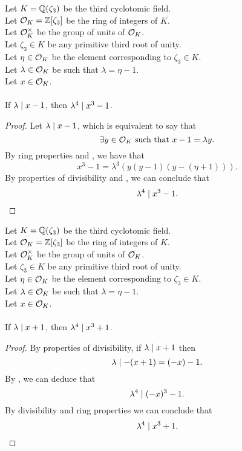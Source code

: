 \begin{lemma}
    \label{lmm:lambda_pow_four_dvd_cube_sub_one_of_dvd_sub_one}
    \leanok
    Let $K = \mathbb{Q}(\zeta_3)$ be the third cyclotomic field. \\
    Let $\mathcal{O}_K = \mathbb{Z}[\zeta_3]$ be the ring of integers of $K$. \\
    Let $\mathcal{O}^\times_K$ be the group of units of $\mathcal{O}_K$. \\
    Let $\zeta_3 \in K$ be any primitive third root of unity. \\
    Let $\eta \in \mathcal{O}_K$ be the element corresponding to $\zeta_3 \in K$. \\
    Let $\lambda \in \mathcal{O}_K$ be such that $\lambda = \eta -1$. \\
    Let $x \in \mathcal{O}_K$. \\\\
    If $\lambda\mid x - 1$, then $\lambda^ 4 \mid x^3 - 1$.
\end{lemma}
\begin{proof}
    \leanok
    Let $\lambda \mid x - 1$, which is equivalent to say that
    $$\exists y\in \mathcal{O}_K \text{ such that } x - 1 = \lambda y.$$
    By ring properties and , we have that
    $$x^3 - 1 = \lambda^3 (y (y - 1) (y - (\eta + 1))).$$
    By properties of divisibility and ,
    we can conclude that $$\lambda^ 4 \mid x^3 - 1.$$
\end{proof}

\begin{lemma}
    \label{lmm:lambda_pow_four_dvd_cube_add_one_of_dvd_add_one}
    \leanok
    Let $K = \mathbb{Q}(\zeta_3)$ be the third cyclotomic field. \\
    Let $\mathcal{O}_K = \mathbb{Z}[\zeta_3]$ be the ring of integers of $K$. \\
    Let $\mathcal{O}^\times_K$ be the group of units of $\mathcal{O}_K$. \\
    Let $\zeta_3 \in K$ be any primitive third root of unity. \\
    Let $\eta \in \mathcal{O}_K$ be the element corresponding to $\zeta_3 \in K$. \\
    Let $\lambda \in \mathcal{O}_K$ be such that $\lambda = \eta -1$. \\
    Let $x \in \mathcal{O}_K$. \\\\
    If $\lambda \mid x + 1$, then $\lambda^4 \mid x ^ 3 + 1$.
\end{lemma}
\begin{proof}
    \leanok
    By properties of divisibility, if $\lambda \mid x + 1$
    then $$\lambda \mid - (x + 1) = (- x) - 1.$$
    By , we can deduce that
    $$\lambda^ 4 \mid (-x)^3 - 1.$$
    By divisibility and ring properties we can conclude that $$\lambda^ 4 \mid x^3 + 1.$$
\end{proof}

